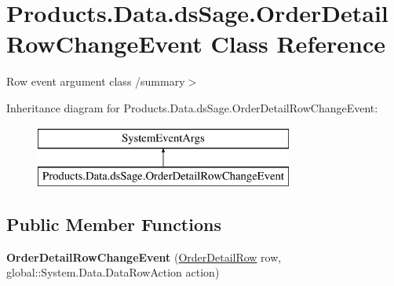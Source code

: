 \hypertarget{class_products_1_1_data_1_1ds_sage_1_1_order_detail_row_change_event}{}\section{Products.\+Data.\+ds\+Sage.\+Order\+Detail\+Row\+Change\+Event Class Reference}
\label{class_products_1_1_data_1_1ds_sage_1_1_order_detail_row_change_event}


Row event argument class /summary$>$  


Inheritance diagram for Products.\+Data.\+ds\+Sage.\+Order\+Detail\+Row\+Change\+Event\+:\begin{figure}[H]
\begin{center}
\leavevmode
\includegraphics[height=2.000000cm]{class_products_1_1_data_1_1ds_sage_1_1_order_detail_row_change_event}
\end{center}
\end{figure}
\subsection*{Public Member Functions}
\begin{DoxyCompactItemize}
\item 
{\bfseries Order\+Detail\+Row\+Change\+Event} (\hyperlink{class_products_1_1_data_1_1ds_sage_1_1_order_detail_row}{Order\+Detail\+Row} row, global\+::\+System.\+Data.\+Data\+Row\+Action action)\hypertarget{class_products_1_1_data_1_1ds_sage_1_1_order_detail_row_change_event_a785080572b8db67926090b2aca687f5b}{}\label{class_products_1_1_data_1_1ds_sage_1_1_order_detail_row_change_event_a785080572b8db67926090b2aca687f5b}

\end{DoxyCompactItemize}
